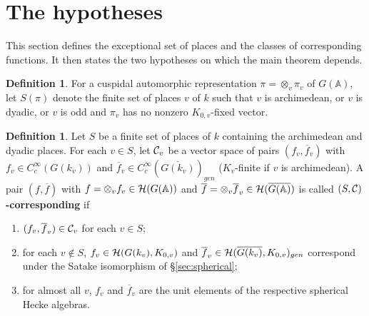 \documentclass[12pt,letterpaper]{book}
\theoremstyle{plain}
\theoremstyle{definition}
\newtheorem{definition}[theorem]{Definition}
\theoremstyle{remark}
\theoremstyle{remark}
\begin{document}
\section{The hypotheses}\label{sec:hypotheses}

This section defines the exceptional set of places and the classes of corresponding functions. It then states the two hypotheses on which the main theorem depends.


\begin{definition}\label{def:exceptional}
For a cuspidal automorphic representation $\pi=\otimes_v\pi_v$ of
$G({\mathbb{A}})$, let $S(\pi)$ denote the finite set of places $v$ of $k$
such that $v$ is archimedean, or $v$ is dyadic, or $v$ is odd and $\pi_v$
has no nonzero $K_{0,v}$-fixed vector.
\end{definition}

\begin{definition}\label{def:corresponding}
Let $S$ be a finite set of places of $k$ containing the archimedean and
dyadic places. For each $v\in S$, let ${\cal C}_v$ be a vector space of
pairs $(f_v,\overline{f}_v)$ with $f_v\in C_c^\infty(G(k_v))$ and
$\overline{f}_v\in C_c^\infty(\overline{G(k_v)})_{gen}$ ($K_v$-finite if
$v$ is archimedean). A pair $(f,\overline{f})$ with
$f=\otimes_v f_v\in{\cal H}(G({\mathbb{A}}))$ and
$\overline{f}=\otimes_v\overline{f}_v\in{\cal H}(\overline{G({\mathbb{A}})})$
is called {\bf $(S,{\cal C})$-corresponding} if
\begin{enumerate}
\item $(f_v,\overline{f}_v)\in{\cal C}_v$ for each $v\in S$;
\item for each $v\notin S$, $f_v\in{\cal H}(G(k_v),K_{0,v})$ and
$\overline{f}_v\in{\cal H}(\overline{G(k_v)},K_{0,v})_{gen}$ correspond
under the Satake isomorphism of \S\ref{sec:spherical};
\item for almost all $v$, $f_v$ and $\overline{f}_v$ are the unit
elements of the respective spherical Hecke algebras.
\end{enumerate}
\end{definition}
\end{document}
